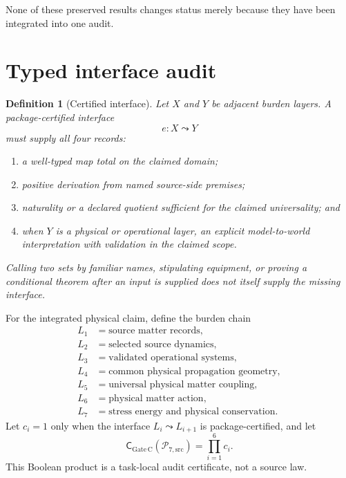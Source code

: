 \documentclass[11pt]{article}
\newtheorem{definition}{Definition}
\newcommand{\Src}{\mathrm{src}}
\newcommand{\Pkg}{\mathcal P_{7,\Src}}
\newcommand{\Cert}{\mathsf C_{\mathrm{Gate\,C}}}
\begin{document}
None of these preserved results changes status merely because they have been
integrated into one audit.

\section{Typed interface audit}

\begin{definition}[Certified interface]
Let \(X\) and \(Y\) be adjacent burden layers. A package-certified interface
\[
 e:X\leadsto Y
\]
must supply all four records:
\begin{enumerate}[leftmargin=*]
\item a well-typed map total on the claimed domain;
\item positive derivation from named source-side premises;
\item naturality or a declared quotient sufficient for the claimed
universality; and
\item when \(Y\) is a physical or operational layer, an explicit
model-to-world interpretation with validation in the claimed scope.
\end{enumerate}
Calling two sets by familiar names, stipulating equipment, or proving a
conditional theorem after an input is supplied does not itself supply the
missing interface.
\end{definition}

For the integrated physical claim, define the burden chain
\[
\begin{split}
 L_1&=\text{source matter records},\\
 L_2&=\text{selected source dynamics},\\
 L_3&=\text{validated operational systems},\\
 L_4&=\text{common physical propagation geometry},\\
 L_5&=\text{universal physical matter coupling},\\
 L_6&=\text{physical matter action},\\
 L_7&=\text{stress energy and physical conservation}.
\end{split}
\]
Let \(c_i=1\) only when the interface \(L_i\leadsto L_{i+1}\) is
package-certified, and let
\[
 \Cert(\Pkg)=\prod_{i=1}^{6}c_i .
\]
This Boolean product is a task-local audit certificate, not a source law.
\end{document}
